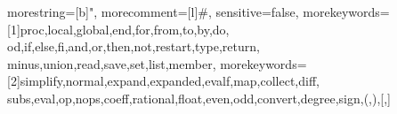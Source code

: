 % 
% 
% 
% 
       
%
%
%


    {%
    morestring=[b]",
    morecomment=[l]\#,
    sensitive=false,
    morekeywords=[1]{proc,local,global,end,for,from,to,by,do,%
            od,if,else,fi,and,or,then,not,restart,type,return,%
    minus,union,read,save,set,list,member},
    morekeywords=[2]{simplify,normal,expand,expanded,evalf,map,collect,diff,%
            subs,eval,op,nops,coeff,rational,float,even,odd,convert,degree,sign,(,),[,]}}

